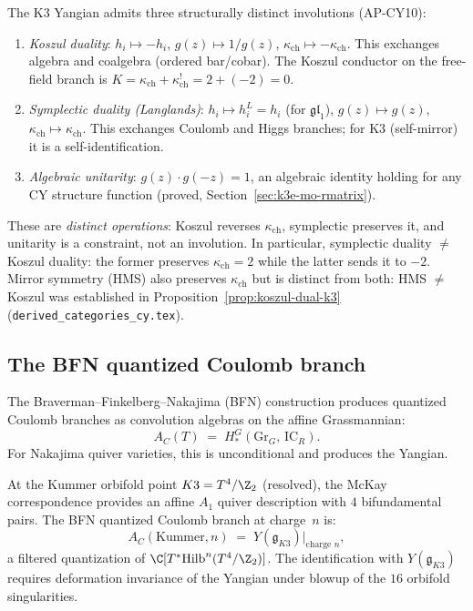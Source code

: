 \begin{remark}
\label{rem:k3e-three-involutions}
The K3 Yangian admits three structurally distinct involutions (AP-CY10):
\begin{enumerate}[label=\textup{(\roman*)}]
 \item \emph{Koszul duality}: $h_i \mapsto -h_i$, $g(z) \mapsto 1/g(z)$, $\kappa_{\mathrm{ch}} \mapsto -\kappa_{\mathrm{ch}}$.  This exchanges algebra and coalgebra (ordered bar/cobar).  The Koszul conductor on the free-field branch is $K = \kappa_{\mathrm{ch}} + \kappa_{\mathrm{ch}}^! = 2 + (-2) = 0$.
 \item \emph{Symplectic duality (Langlands)}: $h_i \mapsto h_i^L = h_i$ (for $\mathfrak{gl}_1$), $g(z) \mapsto g(z)$, $\kappa_{\mathrm{ch}} \mapsto \kappa_{\mathrm{ch}}$.  This exchanges Coulomb and Higgs branches; for K3 (self-mirror) it is a self-identification.
 \item \emph{Algebraic unitarity}: $g(z) \cdot g(-z) = 1$, an algebraic identity holding for any CY structure function (proved, Section~\ref{sec:k3e-mo-rmatrix}).
\end{enumerate}
These are \emph{distinct operations}: Koszul reverses $\kappa_{\mathrm{ch}}$, symplectic preserves it, and unitarity is a constraint, not an involution.  In particular, symplectic duality $\neq$ Koszul duality: the former preserves $\kappa_{\mathrm{ch}} = 2$ while the latter sends it to $-2$.  Mirror symmetry (HMS) also preserves $\kappa_{\mathrm{ch}}$ but is distinct from both: HMS $\neq$ Koszul was established in Proposition~\ref{prop:koszul-dual-k3} (\texttt{derived\_categories\_cy.tex}).
\end{remark}

\subsection{The BFN quantized Coulomb branch}
\label{subsec:k3e-bfn}

The Braverman--Finkelberg--Nakajima (BFN) construction produces quantized Coulomb branches as convolution algebras on the affine Grassmannian:
\[
  A_C(T) \;=\; H^G_*(\mathrm{Gr}_G,\, \mathrm{IC}_R).
\]
For Nakajima quiver varieties, this is unconditional and produces the Yangian.

\begin{conjecture}[BFN = K3 Yangian]
\label{conj:k3e-bfn-yangian}
\ClaimStatusConjectured
At the Kummer orbifold point $K3 = T^4/\Z_2$ (resolved), the McKay correspondence provides an affine $A_1$ quiver description with $4$ bifundamental pairs.  The BFN quantized Coulomb branch at charge~$n$ is:
\[
  A_C(\text{Kummer}, n) \;=\; Y(\mathfrak{g}_{K3})\big|_{\text{charge } n},
\]
a filtered quantization of $\C[T^*\!\operatorname{Hilb}^n(T^4/\Z_2)]$.  The identification with $Y(\mathfrak{g}_{K3})$ requires deformation invariance of the Yangian under blowup of the $16$ orbifold singularities.
\end{conjecture}

